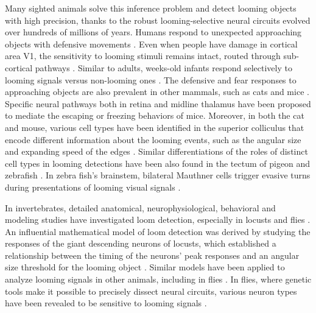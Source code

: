 \documentclass[9pt,lineno]{elife}
\begin{document}
Many sighted animals solve this inference problem and detect looming objects with high precision, thanks to the robust looming-selective neural circuits evolved over hundreds of millions of years. Humans respond to unexpected approaching objects with defensive movements \citep{king1992use}. Even when people have damage in cortical area V1, the sensitivity to looming stimuli remains intact, routed through sub-cortical pathways \citep{hervais2015looming}. Similar to adults, weeks-old infants respond selectively to looming signals versus non-looming ones \citep{ball1971infant}. The defensive and fear responses to approaching objects are also prevalent in other mammals, such as cats \citep{liu2011neuronal} and mice \citep{yilmaz2013rapid,shang2015parvalbumin,salay2018midline}. Specific neural pathways both in retina \citep{yilmaz2013rapid} and midline thalamus \citep{salay2018midline} have been proposed to mediate the escaping or freezing behaviors of mice. Moreover, in both the cat and mouse, various cell types have been identified in the superior colliculus that encode different information about the looming events, such as the angular size and expanding speed of the edges \citep{liu2011neuronal,shang2015parvalbumin}. Similar differentiations of the roles of distinct cell types in looming detections have been also found in the tectum of pigeon \citep{wu2005tectal} and zebrafish \citep{temizer2015visual,dunn2016neural}. In zebra fish's brainstem, bilateral Mauthner cells trigger evasive turns during presentations of looming visual signals \citep{bhattacharyya2017visual}. 




In invertebrates, detailed anatomical, neurophysiological, behavioral and modeling studies have investigated loom detection, especially in locusts and flies \citep{oliva2014computation,sato2014role,santer2005gliding,gabbiani1999computation,rind1996neural,card2008visually,de2012loom,muijres2014flies,klapoetke2017ultra,von2017feature,ache2019neural}. An influential mathematical model of loom detection was derived by studying the responses of the giant descending neurons of locusts, which established a relationship between the timing of the neurons' peak responses and an angular size threshold for the looming object \citep{gabbiani1999computation}. Similar models have been applied to analyze looming signals in other animals, including in flies \citep{von2017feature,ache2019neural}. In flies, where  genetic tools make it possible to precisely dissect neural circuits, various neuron types have been revealed to be sensitive to looming signals \citep{von2017feature,ache2019neural,morimoto2020spatial}.
\end{document}
